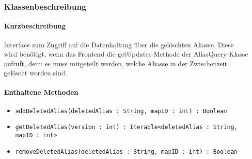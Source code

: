 \subsubsection*{Klassenbeschreibung}%
\paragraph*{Kurzbeschreibung}
Interface zum Zugriff auf die Datenhaltung über die gelöschten Aliasse. Diese wird benötigt, wenn das Frontend die getUpdates-Methode der AliasQuery-Klasse aufruft, 
denn es muss mitgeteilt werden, welche Aliasse in der Zwischenzeit gelöscht worden sind.

\paragraph*{Enthaltene Methoden}
\begin{itemize}
    \item \texttt{addDeletedAlias(deletedAlias : String, mapID : int) : Boolean}
    \item \texttt{getDeletedAlias(version : int) : Iterable<deletedAlias : String, mapID : int>}
    \item \texttt{removeDeletedAlias(deletedAlias : String, mapID : int) : Boolean}
\end{itemize}
